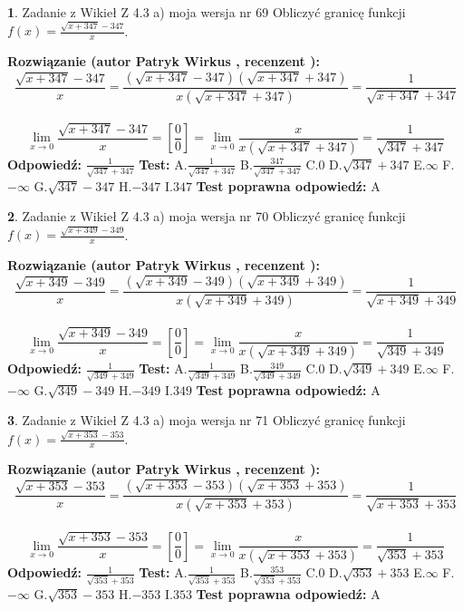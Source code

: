 \documentclass[12pt, a4paper]{article}
\theoremstyle{definition} %
\newtheorem{zad}{}
\newcommand{\zadStart}[1]{\begin{zad}#1\newline}
\newcommand{\zadStop}{\end{zad}}
\newcommand{\rozwStart}[2]{\noindent \textbf{Rozwiązanie (autor #1 , recenzent #2): }\newline}
\newcommand{\rozwStop}{\newline}
\newcommand{\odpStart}{\noindent \textbf{Odpowiedź:}\newline}
\newcommand{\odpStop}{\newline}
\newcommand{\testStart}{\noindent \textbf{Test:}\newline}
\newcommand{\testStop}{\newline}
\newcommand{\kluczStart}{\noindent \textbf{Test poprawna odpowiedź:}\newline}
\newcommand{\kluczStop}{\newline}
\begin{document}
\zadStart{Zadanie z Wikieł Z 4.3 a) moja wersja nr 69}
Obliczyć granicę funkcji $f(x)=\frac{\sqrt{x+347}-347}{x}$.
\zadStop
\rozwStart{Patryk Wirkus}{}
$$\frac{\sqrt{x+347}-347}{x}=\frac{(\sqrt{x+347}-347)(\sqrt{x+347}+347)}{x(\sqrt{x+347}+347)}=\frac{1}{\sqrt{x+347}+347}$$
\\
$$\lim\limits_{x\to0}\frac{\sqrt{x+347}-347}{x}=[\frac{0}{0}]=
\lim\limits_{x\to0}\frac{x}{x(\sqrt{x+347}+347)} = \frac{1}{\sqrt{347}+347}$$
\rozwStop
\odpStart
$\frac{1}{\sqrt{347}+347}$
\odpStop
\testStart
A.$\frac{1}{\sqrt{347}+347}$
B.$\frac{347}{\sqrt{347}+347}$
C.$0$
D.$\sqrt{347}+347$
E.$\infty$
F.$-\infty$
G.$\sqrt{347}-347$
H.$-347$
I.$347$
\testStop
\kluczStart
A
\kluczStop



\zadStart{Zadanie z Wikieł Z 4.3 a) moja wersja nr 70}
Obliczyć granicę funkcji $f(x)=\frac{\sqrt{x+349}-349}{x}$.
\zadStop
\rozwStart{Patryk Wirkus}{}
$$\frac{\sqrt{x+349}-349}{x}=\frac{(\sqrt{x+349}-349)(\sqrt{x+349}+349)}{x(\sqrt{x+349}+349)}=\frac{1}{\sqrt{x+349}+349}$$
\\
$$\lim\limits_{x\to0}\frac{\sqrt{x+349}-349}{x}=[\frac{0}{0}]=
\lim\limits_{x\to0}\frac{x}{x(\sqrt{x+349}+349)} = \frac{1}{\sqrt{349}+349}$$
\rozwStop
\odpStart
$\frac{1}{\sqrt{349}+349}$
\odpStop
\testStart
A.$\frac{1}{\sqrt{349}+349}$
B.$\frac{349}{\sqrt{349}+349}$
C.$0$
D.$\sqrt{349}+349$
E.$\infty$
F.$-\infty$
G.$\sqrt{349}-349$
H.$-349$
I.$349$
\testStop
\kluczStart
A
\kluczStop



\zadStart{Zadanie z Wikieł Z 4.3 a) moja wersja nr 71}
Obliczyć granicę funkcji $f(x)=\frac{\sqrt{x+353}-353}{x}$.
\zadStop
\rozwStart{Patryk Wirkus}{}
$$\frac{\sqrt{x+353}-353}{x}=\frac{(\sqrt{x+353}-353)(\sqrt{x+353}+353)}{x(\sqrt{x+353}+353)}=\frac{1}{\sqrt{x+353}+353}$$
\\
$$\lim\limits_{x\to0}\frac{\sqrt{x+353}-353}{x}=[\frac{0}{0}]=
\lim\limits_{x\to0}\frac{x}{x(\sqrt{x+353}+353)} = \frac{1}{\sqrt{353}+353}$$
\rozwStop
\odpStart
$\frac{1}{\sqrt{353}+353}$
\odpStop
\testStart
A.$\frac{1}{\sqrt{353}+353}$
B.$\frac{353}{\sqrt{353}+353}$
C.$0$
D.$\sqrt{353}+353$
E.$\infty$
F.$-\infty$
G.$\sqrt{353}-353$
H.$-353$
I.$353$
\testStop
\kluczStart
A
\kluczStop
\end{document}
